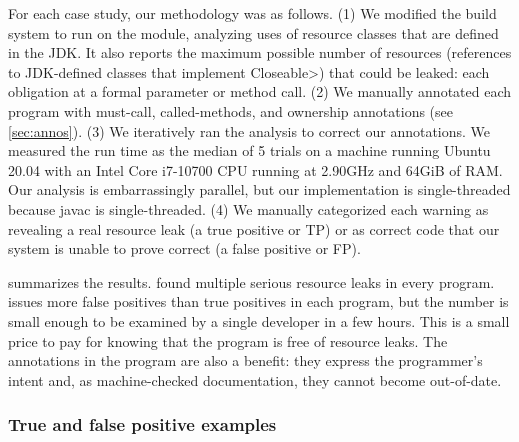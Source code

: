 For each case study, our methodology was as follows.
(1)
We modified the
build system to run \tool on the module, analyzing uses of resource
classes that are defined in the JDK\@.
It also reports the maximum possible number of resources (references to JDK-defined
classes that implement \<Closeable>) that could be
leaked:  each obligation at a formal parameter or method call.
(2) We manually
annotated each program with must-call, called-methods, and ownership
annotations (see \cref{sec:annos}).
(3) We iteratively ran the analysis to correct our annotations.
We measured the run time
as the median of 5 trials on
a machine running Ubuntu 20.04 with an Intel Core i7-10700 CPU running at 2.90GHz and 64GiB of RAM\@.
Our analysis is embarrassingly parallel, but our implementation is
single-threaded because javac is single-threaded.
(4) We manually categorized each warning as revealing a
real resource leak (a true positive or TP) or as correct code that our
system is unable to prove correct (a false positive or FP\@).

 summarizes the results. \Tool found multiple
serious resource leaks in every program. \Tool issues
more false positives than true positives in each program, but
the number is small enough to be examined by a single developer in a
few hours.  This is a small price to pay for knowing that the program is
free of resource leaks.  The annotations in the program are
also a benefit: they
express the programmer's intent and, as machine-checked documentation,
they cannot become out-of-date.




\subsubsection{True and false positive examples}
\label{sec:examples}


